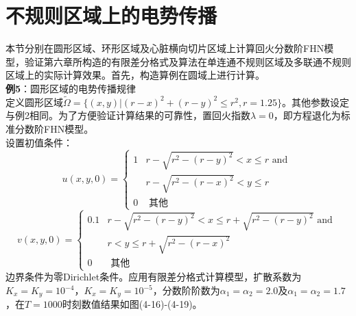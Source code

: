 \documentclass[twoside,UTF8]{nputhesis}
\begin{document}
\section{不规则区域上的电势传播}
本节分别在圆形区域、环形区域及心脏横向切片区域上计算回火分数阶FHN模型，验证第六章所构造的有限差分格式及算法在单连通不规则区域及多联通不规则区域上的实际计算效果。首先，构造算例在圆域上进行计算。\\
\noindent   %
\textbf{例5}：圆形区域的电势传播规律\\
定义圆形区域$\tilde{\Omega }=\{(x,y)|{{(r-x)}^{2}}+{{(r-y)}^{2}}\le {{r}^{2}},r=1.25\}$。其他参数设定与例2相同。为了方便验证计算结果的可靠性，置回火指数$\lambda =0$，即方程退化为标准分数阶FHN模型。\\
设置初值条件：
\[u(x, y, 0)=\left\{\begin{array}{cl}{1} & {r-\sqrt{r^{2}-(r-y)^{2}}<x \leq r \text { and }} \\ {} & {r-\sqrt{r^{2}-(r-x)^{2}}<y \leq r} \\ {0} & {\text { 其他 }}\end{array}\right.\]
\[v(x, y, 0)=\left\{\begin{array}{ll}{0.1} & {r-\sqrt{r^{2}-(r-y)^{2}}<x \leq r+\sqrt{r^{2}-(r-y)^{2}} \text { and }} \\ {} & {r<y \leq r+\sqrt{r^{2}-(r-x)^{2}}} \\ {0} & {\text { 其他 }}\end{array}\right.\]
边界条件为零Dirichlet条件。应用有限差分格式计算模型，扩散系数为${{K}_{x}}={{K}_{y}}={{10}^{-4}}$，${{K}_{x}}={{K}_{y}}={{10}^{-5}}$，分数阶阶数为${{\alpha }_{1}}={{\alpha }_{2}}=2.0$及${{\alpha }_{1}}={{\alpha }_{2}}=1.7$，在$T=1000$时刻数值结果如图(4-16)-(4-19)。
\end{document}
